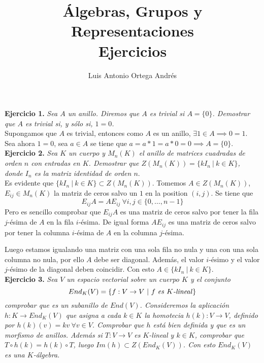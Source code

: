 \documentclass[UTF8]{article}
\begin{document}
\title{Álgebras, Grupos y Representaciones \\
      \large Ejercicios
  }

\author{Luis Antonio Ortega Andrés}

\maketitle

\textbf{Ejercicio 1.} \emph{Sea \(A\) un anillo. Diremos que \(A\) es trivial si
  \(A = \{0\}\). Demostrar que \(A\) es trivial si, y sólo si, \(1 = 0\).}\\

Supongamos que \(A\) es trivial, entonces como \(A\) es un anillo, \(\exists 1
\in A \implies 0 = 1\). Sea ahora \(1 = 0\), sea \(a \in A\) se tiene que \(a =
a*1 = a*0 = 0 \implies A = \{0\}\).\\

\textbf{Ejercicio 2.} \emph{Sea \(K\) un cuerpo y \(M_n(K)\) el anillo de
  matrices cuadradas de orden \(n\) con entradas en \(K\). Demostrar que
  \(Z(M_n(K)) = \{kI_n \ | \  k \in K\}\), donde \(I_n\) es la matriz identidad
  de orden \(n\)}.\\

Es evidente que  \(\{kI_n \ | \  k \in K\} \subset Z(M_n(K))\). Tomemos \(A \in
Z(M_n(K))\), \(E_{ij} \in M_n(K)\) la matriz de ceros salvo un \(1\) en la
position \((i,j)\). Se tiene que
\[
E_{ij}A = AE_{ij} \ \forall i,j \in \{0,\dots,n-1\}
\]
Pero es sencillo comprobar que \(E_{ij}A\) es una matriz de ceros salvo por
tener la fila \(j\)-ésima de \(A\) en la fila \(i\)-ésima. De igual forma \(AE_{ij}\) es una matriz de ceros salvo por
tener la columna \(i\)-ésima de \(A\) en la columna \(j\)-ésima.

Luego estamos igualando una matriz con una sola fila no nula y una con una sola
columna no nula, por ello \(A\) debe ser diagonal. Además, el valor \(i\)-ésimo
y el valor \(j\)-ésimo de la diagonal deben coincidir. Con esto \(A \in \{kI_n
\ | \  k \in K\}\).\\

\textbf{Ejercicio 3.} \emph{Sea \(V\) un espacio vectorial sobre un cuerpo \(K\)
  y el
  conjunto}
\[
End_K(V) = \{f:V \to V \ | \ f \text{ \emph{es} } K\text{\emph{-lineal}}\}
\]
\emph{comprobar que es un subanillo de \(End(V)\). Consideremos la aplicación \(h:K \to End_K(V)\)
que asigna a cada \(k \in K\) la homotecia \(h(k):V \to V\), definido por
\(h(k)(v) = kv \ \forall v \in V\). Comprobar que \(h\) está bien definida y que es
un morfismo de anillos. Además si \(T:V \to V\) es \(K\)-lineal y \(k \in K\),
comprobar que \(T \circ h(k) = h(k) \circ T\), luego \(Im(h) \subset
Z(End_K(V))\). Con esto \(End_K(V)\) es una \(K\)-álgebra.}\\
\end{document}
